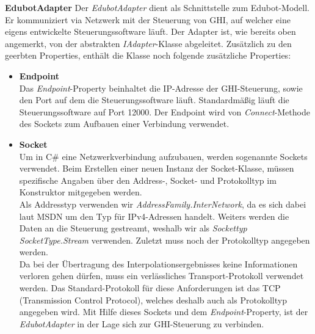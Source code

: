 \textbf{EdubotAdapter}
\newline
Der \textit{EdubotAdapter} dient als Schnittstelle zum Edubot-Modell. Er kommuniziert via Netzwerk mit der Steuerung von GHI, auf welcher eine eigens entwickelte Steuerungssoftware läuft. Der Adapter ist, wie bereits oben angemerkt, von der abstrakten \textit{IAdapter}-Klasse abgeleitet. Zusätzlich zu den geerbten Properties, enthält die Klasse noch folgende zusätzliche Properties:
\begin{itemize}
\item \textbf{Endpoint}\\
Das \textit{Endpoint}-Property beinhaltet die IP-Adresse der GHI-Steuerung, sowie den Port auf dem die Steuerungssoftware läuft. Standardmäßig läuft die Steuerungssoftware auf Port 12000. Der Endpoint wird von \textit{Connect}-Methode des Sockets zum Aufbauen einer Verbindung verwendet.
\item \textbf{Socket}\\
Um in C\# eine Netzwerkverbindung aufzubauen, werden sogenannte Sockets verwendet. Beim Erstellen einer neuen Instanz der Socket-Klasse, müssen spezifische Angaben über den Address-, Socket- und Protokolltyp im Konstruktor mitgegeben werden.\\
Als Addresstyp verwenden wir \textit{AddressFamily.InterNetwork}, da es sich dabei laut MSDN um den Typ für IPv4-Adressen handelt. Weiters werden die Daten an die Steuerung gestreamt, weshalb wir als \textit{Sockettyp SocketType.Stream} verwenden. Zuletzt muss noch der Protokolltyp angegeben werden. \\
Da bei der Übertragung des Interpolationsergebnisses keine Informationen verloren gehen dürfen, muss ein verlässliches Transport-Protokoll verwendet werden. Das Standard-Protokoll für diese Anforderungen ist das TCP (Transmission Control Protocol), welches deshalb auch als Protokolltyp angegeben wird.
Mit Hilfe dieses Sockets und dem \textit{Endpoint}-Property, ist der \textit{EdubotAdapter} in der Lage sich zur GHI-Steuerung zu verbinden.
\end{itemize}

